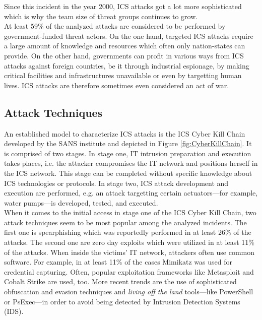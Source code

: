 \documentclass[runningheads]{llncs}
\begin{document}
Since this incident in the year 2000, ICS attacks got a lot more sophisticated which is why the team size of threat groups continues to grow.\\
At least 59\% of the analyzed attacks are considered to be performed by government-funded threat actors.
On the one hand, targeted ICS attacks require a large amount of knowledge and resources which often only nation-states can provide.
On the other hand, governments can profit in various ways from ICS attacks against foreign countries, be it through industrial espionage, by making critical facilities and infrastructures unavailable or even by targetting human lives.
ICS attacks are therefore sometimes even considered an act of war. %

\subsection{Attack Techniques}
An established model to characterize ICS attacks is the ICS Cyber Kill Chain developed by the SANS institute and depicted in Figure \ref{fig:CyberKillChain}.
It is comprised of two stages.
In stage one, IT intrusion preparation and execution takes places, i.e. the attacker compromises the IT network and positions herself in the ICS network.
This stage can be completed without specific knowledge about ICS technologies or protocols.
In stage two, ICS attack development and execution are performed, e.g. an attack targetting certain actuators---for example, water pumps---is developed, tested, and executed.\\
When it comes to the initial access in stage one of the ICS Cyber Kill Chain, two attack techniques seem to be most popular among the analyzed incidents.
The first one is spearphishing which was reportedly performed in at least 26\% of the attacks.
The second one are zero day exploits which were utilized in at least 11\% of the attacks.
When inside the victims' IT network, attackers often use common software.
For example, in at least 11\% of the cases Mimikatz was used for credential capturing.
Often, popular exploitation frameworks like Metasploit and Cobalt Strike are used, too.
More recent trends are the use of sophisticated obfuscation and evasion techniques and \textit{living off the land} tools---like PowerShell or PsExec---in order to avoid being detected by Intrusion Detection Systems (IDS).\\
\end{document}
